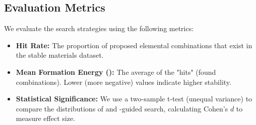 \subsection{Evaluation Metrics}
We evaluate the search strategies using the following metrics:
\begin{itemize}[leftmargin=*,itemsep=0pt,topsep=0pt]
    \item {\bf Hit Rate:} The proportion of proposed elemental combinations that exist in the \gnome stable materials dataset.
    \item {\bf Mean Formation Energy (\efeas):} The average \efeas of the "hits" (found combinations). Lower (more negative) values indicate higher stability.
    \item {\bf Statistical Significance:} We use a two-sample t-test (unequal variance) to compare the \efeas distributions of \randomsearch and \llm-guided search, calculating Cohen's $d$ to measure effect size.
\end{itemize}
